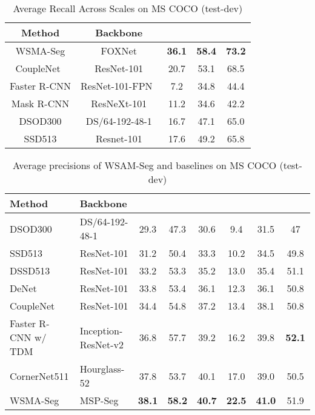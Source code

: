 \documentclass{article}
\begin{document}
{\begin{table*}[!ht]
\begin{small}
        \caption{Average Recall Across Scales on MS COCO (test-dev)\label{coco4}}
				\vspace{0.3em}
        \begin{tabular}{|c|c|c|c|c|}
          \hline
          Method&Backbone&&&\\\hline
          WSMA-Seg&FOXNet&\textbf{36.1}&\textbf{58.4}&\textbf{73.2}\\\hline
          CoupleNet~\cite{zhu2017couplenet}&ResNet-101&20.7&53.1&68.5\\\hline
Faster R-CNN&ResNet-101-FPN~\cite{lin2017feature}&7.2&34.8&44.4\\\hline
Mask R-CNN&ResNeXt-101&11.2&34.6&42.2\\\hline
DSOD300&DS/64-192-48-1&16.7&47.1&65.0\\\hline
          SSD513&Resnet-101&17.6&49.2&65.8\\\hline
          \end{tabular}\vspace{0.3em}
  \end{small}
\end{table*}
}










\begin{table*}[!ht]
   \centering
   \vspace{-0.5em}
	\caption{Average precisions of WSAM-Seg and baselines on MS COCO (test-dev)\label{coco_precision}}
\begin{small}
   \begin{tabular}{|l|l|c|c|c|c|c|c|}
   \hline
   Method&Backbone&  &  &&& &  \\\hline
   DSOD300&DS/64-192-48-1&29.3&47.3&30.6&9.4&31.5&47\\\hline
   SSD513&ResNet-101&31.2&50.4&33.3&10.2&34.5&49.8\\\hline
   DSSD513&ResNet-101&33.2&53.3&35.2&13.0&35.4&51.1\\\hline
   DeNet&ResNet-101&33.8&53.4&36.1&12.3&36.1&50.8\\\hline
   CoupleNet&ResNet-101&34.4&54.8&37.2&13.4&38.1&50.8\\\hline
   Faster R-CNN w/ TDM&Inception-ResNet-v2&36.8&57.7&39.2&16.2&39.8&\textbf{52.1}\\\hline
   CornerNet511&Hourglass-52&37.8&53.7&40.1&17.0&39.0&50.5\\\hline
   WSMA-Seg&MSP-Seg&\textbf{38.1}&\textbf{58.2}&\textbf{40.7}&\textbf{22.5}&\textbf{41.0}&51.9\\\hline
  \end{tabular}\end{small}
\end{table*}
\end{document}

